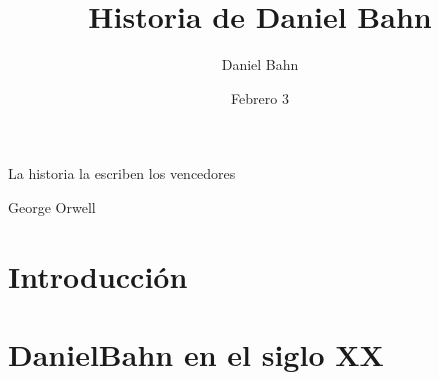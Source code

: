 \documentclass{DccDiyTools/DccDiyTools}
\title{Historia de Daniel Bahn}
\author{Daniel Bahn}
\date{Febrero 3}
\begin{document}
\maketitle
\newpage

\epigraph{La historia la escriben los vencedores}{George Orwell} 

\section{Introducción}

\newpage
\section{DanielBahn en el siglo XX}

\end{document}
